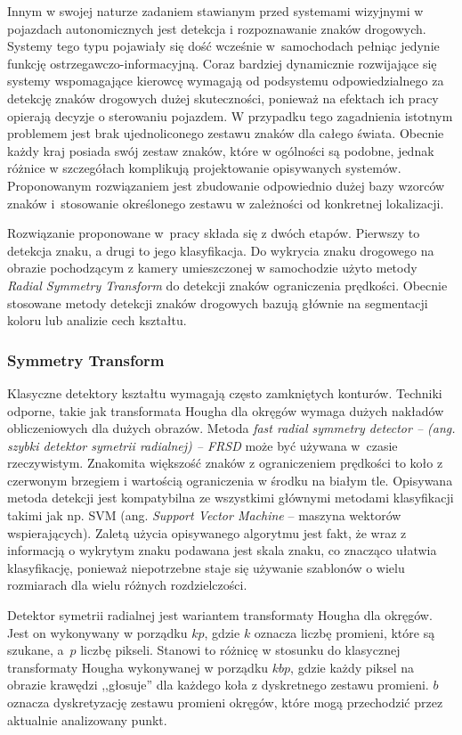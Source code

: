 Innym w swojej naturze zadaniem stawianym przed systemami wizyjnymi w pojazdach autonomicznych jest detekcja i rozpoznawanie znaków drogowych. 
Systemy tego typu pojawiały się dość wcześnie w~samochodach pełniąc jedynie funkcję ostrzegawczo-informacyjną.
Coraz bardziej dynamicznie rozwijające się systemy wspomagające kierowcę wymagają od podsystemu odpowiedzialnego za detekcję znaków drogowych dużej skuteczności, ponieważ na efektach ich pracy opierają decyzje o sterowaniu pojazdem. 
W przypadku tego zagadnienia istotnym problemem jest brak ujednoliconego zestawu znaków dla całego świata. 
Obecnie każdy kraj posiada swój zestaw znaków, które w ogólności są podobne, jednak różnice w szczegółach komplikują projektowanie opisywanych systemów. 
Proponowanym rozwiązaniem jest zbudowanie odpowiednio dużej bazy wzorców znaków i~stosowanie określonego zestawu w zależności od konkretnej lokalizacji. 

Rozwiązanie proponowane w~pracy \cite{T2} składa się z dwóch etapów. 
Pierwszy to detekcja znaku, a drugi to jego klasyfikacja. 
Do wykrycia znaku drogowego na obrazie pochodzącym z kamery umieszczonej w samochodzie użyto metody \textit{Radial Symmetry Transform} do detekcji znaków ograniczenia prędkości. 
Obecnie stosowane metody detekcji znaków drogowych bazują głównie na segmentacji koloru lub analizie cech kształtu. 

\subsubsection{Symmetry Transform}

Klasyczne detektory kształtu wymagają często zamkniętych konturów. 
Techniki odporne, takie jak transformata Hougha dla okręgów wymaga dużych nakładów obliczeniowych dla dużych obrazów. 
Metoda \textit{\textit{fast radial symmetry detector} -- (ang. szybki detektor symetrii radialnej) -- FRSD} może być używana w~czasie rzeczywistym. 
Znakomita większość znaków z ograniczeniem prędkości to koło z czerwonym brzegiem i wartością ograniczenia w środku na białym tle. 
Opisywana metoda detekcji jest kompatybilna ze wszystkimi głównymi metodami klasyfikacji takimi jak np. SVM (ang. \textit{Support Vector Machine} -- maszyna wektorów wspierających). 
Zaletą użycia opisywanego algorytmu jest fakt, że wraz z informacją o wykrytym znaku podawana jest skala znaku, co znacząco ułatwia klasyfikację, ponieważ niepotrzebne staje się używanie szablonów o wielu rozmiarach dla wielu różnych rozdzielczości. 


Detektor  symetrii radialnej jest wariantem transformaty Hougha dla okręgów. 
Jest on wykonywany w porządku $kp$, gdzie $k$ oznacza liczbę promieni, które są szukane, a~$p$ liczbę pikseli. 
Stanowi to różnicę w stosunku do klasycznej transformaty Hougha wykonywanej w porządku $kbp$, gdzie każdy piksel na obrazie krawędzi ,,głosuje'' dla każdego koła z dyskretnego zestawu promieni. $b$ oznacza dyskretyzację zestawu promieni okręgów, które mogą przechodzić przez aktualnie analizowany punkt.

